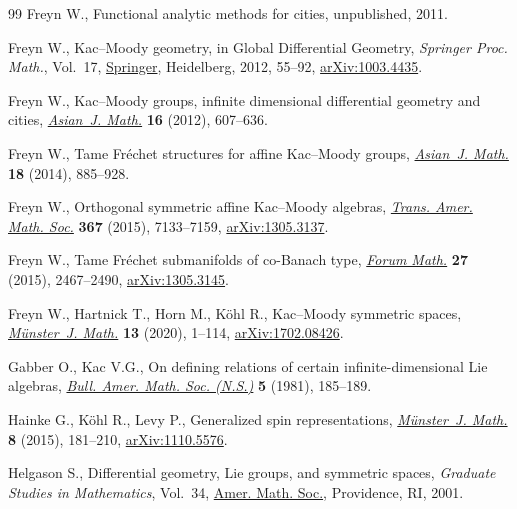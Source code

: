 \documentclass[11pt]{article}
\numberwithin{equation}{section}
\numberwithin{equation}{section}
\begin{document}
\begin{thebibliography}{99}
Freyn W., Functional analytic methods for cities, unpublished, 2011.

Freyn W., Kac--{M}oody geometry, in Global Differential Geometry,
 \textit{Springer Proc. Math.}, Vol.~17, \href{https://doi.org/10.1007/978-3-642-22842-1_3}{Springer}, Heidelberg, 2012, 55--92,
 \href{https://arxiv.org/abs/1003.4435}{arXiv:1003.4435}.

Freyn W., Kac--{M}oody groups, infinite dimensional differential geometry and
 cities, \href{https://doi.org/10.4310/AJM.2012.v16.n4.a3}{\textit{Asian~J. Math.}} \textbf{16} (2012), 607--636.

Freyn W., Tame {F}r\'echet structures for affine {K}ac--{M}oody groups,
 \href{https://doi.org/10.4310/AJM.2014.v18.n5.a6}{\textit{Asian~J. Math.}} \textbf{18} (2014), 885--928.

Freyn W., Orthogonal symmetric affine {K}ac--{M}oody algebras, \href{https://doi.org/10.1090/tran/6257}{\textit{Trans.
 Amer. Math. Soc.}} \textbf{367} (2015), 7133--7159, \href{https://arxiv.org/abs/1305.3137}{arXiv:1305.3137}.

Freyn W., Tame {F}r\'echet submanifolds of co-{B}anach type, \href{https://doi.org/10.1515/forum-2012-0154}{\textit{Forum
 Math.}} \textbf{27} (2015), 2467--2490, \href{https://arxiv.org/abs/1305.3145}{arXiv:1305.3145}.

Freyn W., Hartnick T., Horn M., K\"ohl R., {K}ac--{M}oody symmetric spaces,
 \href{https://doi.org/10.17879/32109566476}{\textit{M\"unster~J. Math.}} \textbf{13} (2020), 1--114, \href{https://arxiv.org/abs/1702.08426}{arXiv:1702.08426}.

Gabber O., Kac V.G., On defining relations of certain infinite-dimensional
 {L}ie algebras, \href{https://doi.org/10.1090/S0273-0979-1981-14940-5}{\textit{Bull. Amer. Math. Soc. (N.S.)}} \textbf{5} (1981),
 185--189.

Hainke G., K\"ohl R., Levy P., Generalized spin representations,
 \href{https://doi.org/10.17879/65219674985}{\textit{M\"unster~J. Math.}} \textbf{8} (2015), 181--210,
 \href{https://arxiv.org/abs/1110.5576}{arXiv:1110.5576}.

Helgason S., Differential geometry, {L}ie groups, and symmetric spaces,
 \textit{Graduate Studies in Mathematics}, Vol.~34, \href{https://doi.org/10.1090/gsm/034}{Amer. Math. Soc.},
 Providence, RI, 2001.


\end{thebibliography}
\end{document}
